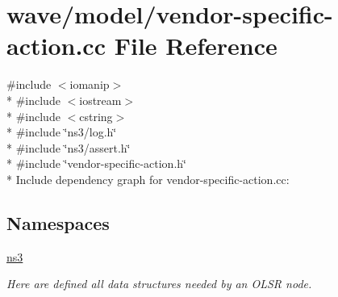 \hypertarget{vendor-specific-action_8cc}{}\section{wave/model/vendor-\/specific-\/action.cc File Reference}
\label{vendor-specific-action_8cc}
{\ttfamily \#include $<$iomanip$>$}\\*
{\ttfamily \#include $<$iostream$>$}\\*
{\ttfamily \#include $<$cstring$>$}\\*
{\ttfamily \#include \char`\"{}ns3/log.\+h\char`\"{}}\\*
{\ttfamily \#include \char`\"{}ns3/assert.\+h\char`\"{}}\\*
{\ttfamily \#include \char`\"{}vendor-\/specific-\/action.\+h\char`\"{}}\\*
Include dependency graph for vendor-\/specific-\/action.cc\+:
\subsection*{Namespaces}
\begin{DoxyCompactItemize}
\item 
 \hyperlink{namespacens3}{ns3}
\begin{DoxyCompactList}\small\item\em Here are defined all data structures needed by an O\+L\+SR node. \end{DoxyCompactList}\end{DoxyCompactItemize}
